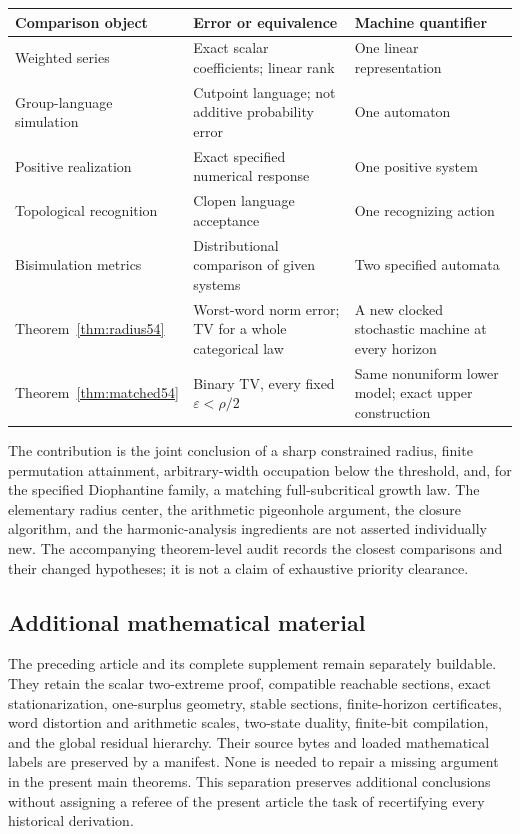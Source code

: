 \begin{center}\small
\begin{tabular}{p{}p{}p{}}
\toprule
Comparison object & Error or equivalence & Machine quantifier\\
\midrule
Weighted series \cite{BR} & Exact scalar coefficients; linear rank & One linear representation\\
Group-language simulation \cite{BP} & Cutpoint language; not additive probability error & One automaton\\
Positive realization \cite{BF04} & Exact specified numerical response & One positive system\\
Topological recognition \cite{Steinberg} & Clopen language acceptance & One recognizing action\\
Bisimulation metrics \cite{FSZ} & Distributional comparison of given systems & Two specified automata\\
Theorem~\ref{thm:radius54} & Worst-word norm error; TV for a whole categorical law & A new clocked stochastic machine at every horizon\\
Theorem~\ref{thm:matched54} & Binary TV, every fixed $\varepsilon<\rho/2$ & Same nonuniform lower model; exact upper construction\\
\bottomrule
\end{tabular}
\end{center}
The contribution is the joint conclusion of a sharp constrained radius, finite permutation attainment, arbitrary-width occupation below the threshold, and, for the specified Diophantine family, a matching full-subcritical growth law. The elementary radius center, the arithmetic pigeonhole argument, the closure algorithm, and the harmonic-analysis ingredients are not asserted individually new. The accompanying theorem-level audit records the closest comparisons and their changed hypotheses; it is not a claim of exhaustive priority clearance.

\subsection{Additional mathematical material}
The preceding article and its complete supplement remain separately buildable. They retain the scalar two-extreme proof, compatible reachable sections, exact stationarization, one-surplus geometry, stable sections, finite-horizon certificates, word distortion and arithmetic scales, two-state duality, finite-bit compilation, and the global residual hierarchy. Their source bytes and loaded mathematical labels are preserved by a manifest. None is needed to repair a missing argument in the present main theorems. This separation preserves additional conclusions without assigning a referee of the present article the task of recertifying every historical derivation.

